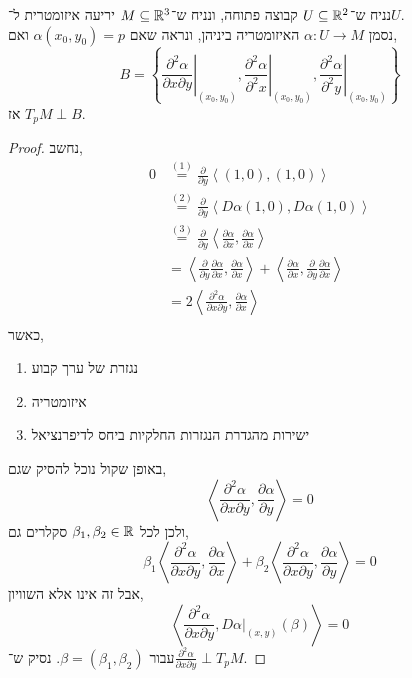 \subquestion{}
נניח ש־$U \subseteq \mathbb{R}^2$ קבוצה פתוחה, ונניח ש־$M \subseteq \mathbb{R}^3$ יריעה איזומטרית ל־$U$. \\
נסמן $\alpha : U \to M$ האיזומטריה ביניהן, ונראה שאם $\alpha(x_0, y_0) = p$ ואם,
\[
	B = 
	\left\{
	\left. \frac{\partial^2 \alpha}{\partial x \partial y} \right\rvert_{(x_0, y_0)},
	\left. \frac{\partial^2 \alpha}{\partial^2 x} \right\rvert_{(x_0, y_0)},
	\left. \frac{\partial^2 \alpha}{\partial^2 y} \right\rvert_{(x_0, y_0)}
	\right\}
\]
אז $T_p M \perp B$.
\begin{proof}
	נחשב,
	\begin{align*}
		0
		& \overset{(1)}{=}  \frac{\partial}{\partial y} \left\langle (1, 0), (1, 0) \right\rangle \\
		& \overset{(2)}{=}  \frac{\partial}{\partial y} \left\langle D \alpha (1, 0), D \alpha (1, 0) \right\rangle \\
		& \overset{(3)}{=}  \frac{\partial}{\partial y} \left\langle \frac{\partial \alpha}{\partial x}, \frac{\partial \alpha}{\partial x} \right\rangle \\
		& = \left\langle \frac{\partial}{\partial y} \frac{\partial \alpha}{\partial x}, \frac{\partial \alpha}{\partial x} \right\rangle
		 + \left\langle \frac{\partial \alpha}{\partial x}, \frac{\partial}{\partial y} \frac{\partial \alpha}{\partial x} \right\rangle \\
		& = 2 \left\langle \frac{\partial^2 \alpha}{\partial x \partial y}, \frac{\partial \alpha}{\partial x} \right\rangle \\
	\end{align*}
	כאשר,
	\begin{enumerate}
		\item נגזרת של ערך קבוע
		\item איזומטריה
		\item ישירות מהגדרת הנגזרות החלקיות ביחס לדיפרנציאל
	\end{enumerate}
	באופן שקול נוכל להסיק שגם,
	\[
		\left\langle \frac{\partial^2 \alpha}{\partial x \partial y}, \frac{\partial \alpha}{\partial y} \right\rangle
		= 0
	\]
	ולכן לכל $\beta_1, \beta_2 \in \mathbb{R}$ סקלרים גם,
	\[
		\beta_1 \left\langle \frac{\partial^2 \alpha}{\partial x \partial y}, \frac{\partial \alpha}{\partial x} \right\rangle
		+ \beta_2 \left\langle \frac{\partial^2 \alpha}{\partial x \partial y}, \frac{\partial \alpha}{\partial y} \right\rangle
		= 0
	\]
	אבל זה אינו אלא השוויון,
	\[
		\left\langle \frac{\partial^2 \alpha}{\partial x \partial y}, D \alpha |_{(x, y)}(\beta) \right\rangle
		= 0
	\]
	עבור $\beta = (\beta_1, \beta_2)$.
	נסיק ש־$\frac{\partial^2 \alpha}{\partial x \partial y} \perp T_p M$.


\end{proof}
